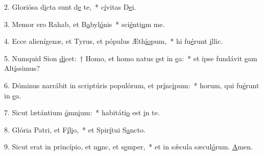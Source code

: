 2. Gloriósa d\uline{i}cta sunt d\uline{e} te,~* c\uline{í}vitas D\uline{e}i.\par 
3. Memor ero Rahab, et B\uline{a}byl\uline{ó}nis~* sci\uline{é}nti\uline{u}m me.\par 
4. Ecce alienígenæ, et Tyrus, et pópulus Æth\uline{í}\uline{o}pum,~* hi fu\uline{é}runt \uline{i}llic.\par 
5. Numquid Sion \uline{di}cet:~† Homo, et homo natus \uline{e}st in \uline{e}a:~* et ipse fundávit \uline{e}am Alt\uline{í}ssimus?\par 
6. Dóminus narrábit in scriptúris populórum, et pr\uline{í}nc\uline{i}pum:~* horum, qui fu\uline{é}runt in \uline{e}a.\par 
7. Sicut lætántium \uline{ó}mn\uline{i}um:~* habitáti\uline{o} est \uline{i}n te.\par 
8. Glória Patri, et F\uline{í}l\uline{i}o,~* et Spir\uline{í}tui S\uline{a}ncto.\par 
9. Sicut erat in princípio, et n\uline{u}nc, et s\uline{e}mper,~* et in sǽcula sæcul\uline{ó}rum. \uline{A}men.\par 
